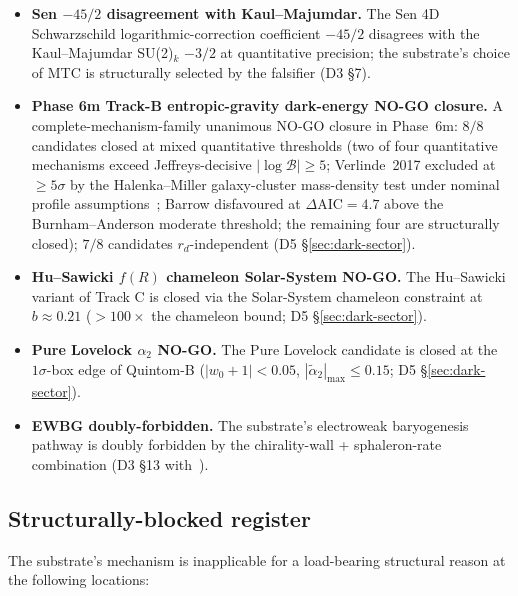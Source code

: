 \documentclass[aps,prd,reprint,nofootinbib,superscriptaddress]{revtex4-2}
\begin{document}
\begin{itemize}
  structure of D4). D3 \S 7 with D4 \S\ref{sec:topological-qc}.
\item \textbf{Sen $-45/2$ disagreement with Kaul--Majumdar.} The
  Sen 4D Schwarzschild logarithmic-correction coefficient $-45/2$
  disagrees with the Kaul--Majumdar SU(2)$_k$ $-3/2$ at quantitative
  precision; the substrate's choice of MTC is structurally selected
  by the falsifier (D3 \S 7).
\item \textbf{Phase 6m Track-B entropic-gravity dark-energy NO-GO
  closure.} A complete-mechanism-family unanimous NO-GO closure in
  Phase~6m: $8/8$ candidates closed at mixed quantitative thresholds
  (two of four quantitative mechanisms exceed Jeffreys-decisive
  $|\!\log\mathcal{B}| \geq 5$; Verlinde~2017 excluded at
  $\geq 5\sigma$ by the Halenka--Miller galaxy-cluster mass-density
  test under nominal profile
  assumptions~\cite{HalenkaMiller2020}; Barrow disfavoured at
  $\Delta\!\mathrm{AIC} = 4.7$ above the Burnham--Anderson moderate
  threshold; the remaining four are structurally closed);
  $7/8$ candidates $r_d$-independent (D5 \S\ref{sec:dark-sector}).
\item \textbf{Hu--Sawicki $f(R)$ chameleon Solar-System NO-GO.} The
  Hu--Sawicki variant of Track C is closed via the
  Solar-System chameleon constraint at $b \approx 0.21$
  ($> 100\times$ the chameleon bound; D5 \S\ref{sec:dark-sector}).
\item \textbf{Pure Lovelock $\alpha_2$ NO-GO.} The Pure Lovelock
  candidate is closed at the $1\sigma$-box edge of Quintom-B
  ($|w_0+1| < 0.05$, $|\tilde\alpha_2|_{\max}\le 0.15$;
  D5 \S\ref{sec:dark-sector}).
\item \textbf{EWBG doubly-forbidden.} The substrate's electroweak
  baryogenesis pathway is doubly forbidden by the chirality-wall
  + sphaleron-rate combination (D3 \S 13 with~\cite{KlinkhamerManton1984,
  ArnoldMcLerran1987}).
\end{itemize}

\subsection{Structurally-blocked register}

The substrate's mechanism is inapplicable for a load-bearing structural
reason at the following locations:
\end{document}
